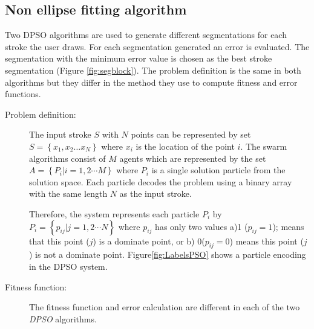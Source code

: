 \documentclass{article}
\begin{document}
\subsection{Non ellipse fitting algorithm}
\label{subsubsec:Discreteparticleswarmalgorithm}
Two DPSO algorithms are used to generate different segmentations for each stroke the user draws. For each segmentation generated an error is evaluated. The segmentation with the minimum error value is chosen as the best stroke segmentation (Figure \ref{fig:segblock}). The problem definition is the same in both algorithms but they differ in the method they use to compute fitness and error functions. 
\begin{description}
	\item[ Problem definition:] The input stroke $S$  with $N$ points can be represented by set $S = \left\{ {x_1 ,x_2  \ldots x_N }\right\}$ where $x_i$ is the location of the point $i$. The swarm algorithms consist of $M$ agents which are represented by the set $A = \left\{ {P_i \left| {i = 1,2 \cdots M} \right.} \right\}$ where $P_i$ is a single solution particle from the solution space. Each particle decodes the problem using a binary array with the same length $N$ as the input stroke.  

Therefore, the system represents each particle $P_i$ by $P_i = \left\{ {p_{ij} \left| {j = 1,2 \cdots N} \right.} \right\}$ where $p_{ij}$ has only two values a)1 ($p_{ij}=1$); means that this point ($j$) is a dominate point, or b) 0($p_{ij}=0$) means this point ($j$) is not a dominate point. Figure\ref{fig:LabelsPSO} shows a particle encoding in the DPSO system. 

	\item[Fitness function:] The fitness function and error calculation are different in each of the two \textit{DPSO} algorithms. 
	\end{description}
\end{document}
